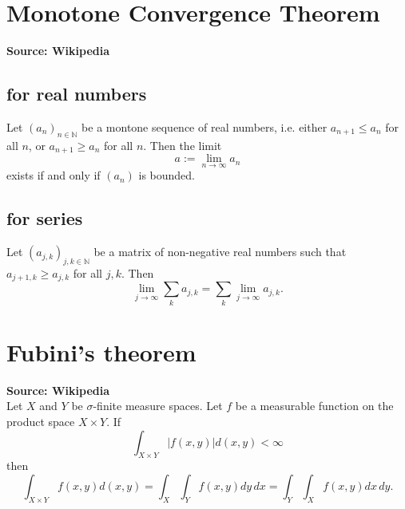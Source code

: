 \documentclass[fleqn]{article}
\newcommand{\1}[1]{\mathbb{I}_{#1}}
\begin{document}
\section{Monotone Convergence Theorem}
\textbf{Source: Wikipedia} \\[10pt]
\subsection{for real numbers}
Let $(a_n)_{n\in\mathbb{N}}$ be a montone sequence of real numbers, i.e. either $a_{n+1} \leq a_n$ for all $n$, or $a_{n+1} \geq a_n$ for all $n$.
Then the limit
\begin{equation*}
a := \lim_{n\to\infty} a_n
\end{equation*}
exists if and only if $(a_n)$ is bounded.

\subsection{for series}
Let $(a_{j,k})_{j,k\in\mathbb{N}}$ be a matrix of non-negative real numbers such that $a_{j+1,k} \geq a_{j,k}$ for all $j,k$.
Then
\begin{equation*}
\lim_{j\to\infty} \sum_k a_{j,k}
= \sum_k \lim_{j\to\infty} a_{j,k} .
\end{equation*}


\section{Fubini's theorem}
\textbf{Source: Wikipedia} \\[10pt]
Let $X$ and $Y$ be $\sigma$-finite measure spaces.
Let $f$ be a measurable function on the product space $X\times Y$.
If
\begin{equation*}
\int_{X\times Y} | f(x,y) | d(x,y) < \infty
\end{equation*}
then
\begin{equation*}
\int_{X\times Y} f(x,y) d(x,y)
= \int_X \int_Y f(x,y) dy \, dx
= \int_Y \int_X f(x,y) dx \, dy .
\end{equation*}








\printbibliography
\end{document}
